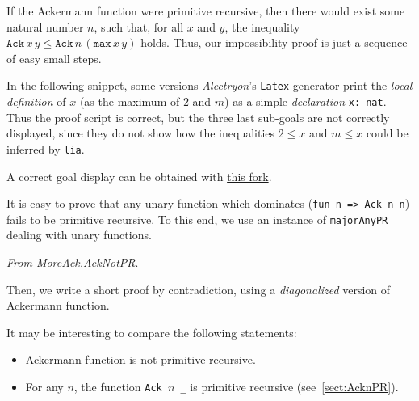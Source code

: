 If the Ackermann function were primitive recursive, then there would exist some natural number $n$, such that, for all $x$ and $y$, the inequality 
$\texttt{Ack}\,x\,y\leq \texttt{Ack}\,n\,(\texttt{max}\,x\,y)$ holds.
Thus, our impossibility proof is just a sequence of easy small steps.

\begin{remark}
In the following snippet,  some versions \emph{Alectryon}'s \texttt{Latex} generator  print the \emph{local definition} of $x$ (as the maximum of $2$ and $m$) as a simple \emph{declaration} \texttt{x: nat}.
Thus the proof script is correct, but the three last sub-goals are not correctly displayed, since 
they do not show how the inequalities $2\leq x$ and $m \leq x$ could be inferred by \texttt{lia}.

A correct goal display can be obtained with
\href{https://github.com/Casteran/alectryonFix}{this fork}.
\end{remark}



\begin{remark}
It is easy to prove that any unary function which dominates (\texttt{fun n => Ack n n}) fails to be primitive recursive. To this end, we use an instance of \texttt{majorAnyPR} dealing with unary functions.

\vspace{4pt}
\noindent

\emph{From \href{../theories/html/hydras.MoreAck.AckNotPR.html}{MoreAck.AckNotPR}}.



Then, we write  a short proof by contradiction, using a 
\emph{diagonalized} version of Ackermann function.



\end{remark}

\begin{remark}
  It may be interesting to compare the following statements:

  \begin{itemize}
  \item Ackermann function is not primitive recursive.
  \item For any $n$, the function \texttt{Ack $n$ \_} is primitive recursive (see~\vref{sect:AcknPR}).
  \end{itemize}
\end{remark}

